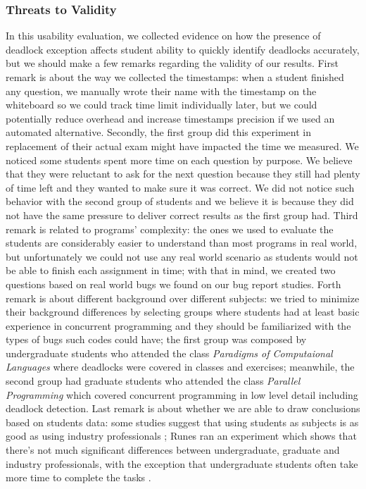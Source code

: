\subsubsection{Threats to Validity}

In this usability evaluation, we collected evidence on how the presence of deadlock exception affects student ability to quickly identify deadlocks accurately, but we should make a few remarks regarding the validity of our results. First remark is about the way we collected the timestamps: when a student finished any question, we manually wrote their name with the timestamp on the whiteboard so we could track time limit individually later, but we could potentially reduce overhead and increase timestamps precision if we used an automated alternative.
Secondly, the first group did this experiment in replacement of their actual exam might have impacted the time we measured. We noticed some students spent more time on each question by purpose. We believe that they were reluctant to ask for the next question because they still had plenty of time left and they wanted to make sure it was correct. We did not notice such behavior with the second group of students and we believe it is because they did not have the same pressure to deliver correct results as the first group had.
Third remark is related to programs' complexity: the ones we used to evaluate the students are considerably easier to understand than most programs in real world, but unfortunately we could not use any real world scenario as students would not be able to finish each assignment in time; with that in mind, we created two questions based on real world bugs we found on our bug report studies.
Forth remark is about different background over different subjects: we tried to minimize their background differences by selecting groups where students had at least basic experience in concurrent programming and they should be familiarized with the types of bugs such codes could have; the first group was composed by undergraduate students who attended the class \emph{Paradigms of Computaional Languages} where deadlocks were covered in classes and exercises; meanwhile, the second group had graduate students who attended the class \emph{Parallel Programming} which covered concurrent programming in low level detail including deadlock detection. Last remark is about whether we are able to draw conclusions based on students data: some studies suggest that using students as subjects is as good as using industry professionals \cite{staron}; Runes ran an experiment which shows that there's not much significant differences between undergraduate, graduate and industry professionals, with the exception that undergraduate students often take more time to complete the tasks \cite{runes}.

